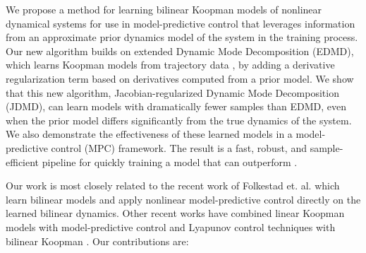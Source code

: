 \documentclass[../root.tex]{subfiles}
\begin{document}
We propose a method for learning bilinear Koopman models of nonlinear dynamical
systems for use in model-predictive control that leverages 
information from an approximate prior dynamics model of the system in the
training process.   Our
new algorithm builds on extended Dynamic Mode Decomposition (EDMD), which learns
Koopman models from trajectory data
\cite{meduri_BiConMP_2022,bruder_Advantages_2021,korda_Linear_2018,
folkestad_Episodic_2020,suh_Surprising_2020}, by adding a derivative
regularization term based on derivatives computed from a prior model.  We show
that this new algorithm, Jacobian-regularized Dynamic Mode Decomposition (JDMD),
can learn models with dramatically fewer samples than EDMD, even when the prior
model differs significantly from the true dynamics of the system.  We also
demonstrate the effectiveness of these learned models in a model-predictive
control (MPC) framework.
The result is a fast, robust, and sample-efficient pipeline for quickly training
a model that can outperform  .

Our work is most closely related to the recent work of Folkestad et. al.
\cite{folkestad_Koopman_2021,folkestad_Episodic_2020,folkestad_Extended_2020,folkestad_KoopNet_2022}
which learn bilinear models and apply nonlinear model-predictive control
directly on the learned bilinear dynamics. Other recent works have combined
linear Koopman models with model-predictive control \cite{korda_Linear_2018} and
Lyapunov control techniques with bilinear Koopman
\cite{narasingam_Datadriven_2022}. Our contributions are:
\end{document}
